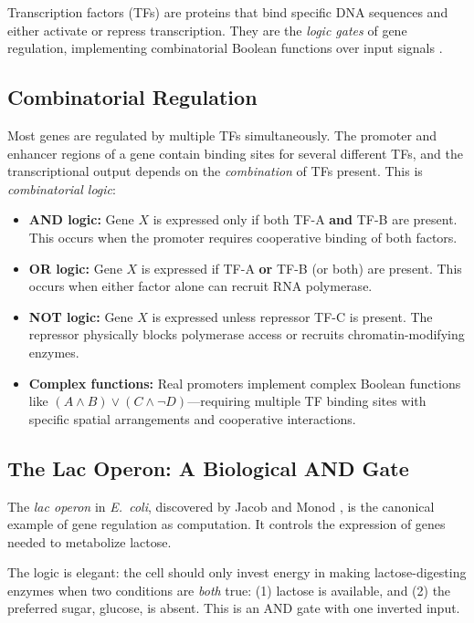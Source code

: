 Transcription factors (TFs) are proteins that bind specific DNA sequences and either activate or repress transcription. They are the \emph{logic gates} of gene regulation, implementing combinatorial Boolean functions over input signals \citep{alon2019}.

\subsection{Combinatorial Regulation}

Most genes are regulated by multiple TFs simultaneously. The promoter and enhancer regions of a gene contain binding sites for several different TFs, and the transcriptional output depends on the \emph{combination} of TFs present. This is \emph{combinatorial logic}:

\begin{itemize}[leftmargin=1.8em]
  \item \textbf{AND logic:} Gene $X$ is expressed only if both TF-A \textbf{and} TF-B are present. This occurs when the promoter requires cooperative binding of both factors.

  \item \textbf{OR logic:} Gene $X$ is expressed if TF-A \textbf{or} TF-B (or both) are present. This occurs when either factor alone can recruit RNA polymerase.

  \item \textbf{NOT logic:} Gene $X$ is expressed unless repressor TF-C is present. The repressor physically blocks polymerase access or recruits chromatin-modifying enzymes.

  \item \textbf{Complex functions:} Real promoters implement complex Boolean functions like $(A \land B) \lor (C \land \lnot D)$---requiring multiple TF binding sites with specific spatial arrangements and cooperative interactions.
\end{itemize}

\subsection{The Lac Operon: A Biological AND Gate}

The \emph{lac operon} in \emph{E.\ coli}, discovered by Jacob and Monod \citep{jacob1961}, is the canonical example of gene regulation as computation. It controls the expression of genes needed to metabolize lactose.

The logic is elegant: the cell should only invest energy in making lactose-digesting enzymes when two conditions are \emph{both} true: (1) lactose is available, and (2) the preferred sugar, glucose, is absent. This is an AND gate with one inverted input.

